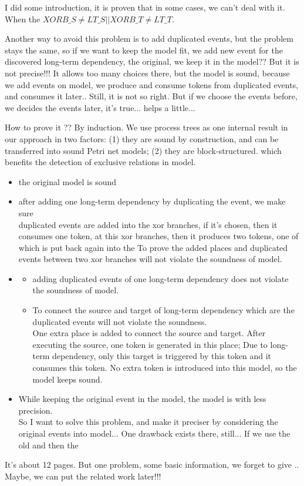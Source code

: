 I did some introduction, it is proven that in some cases, we can't deal with it. When the $XORB\_S \neq LT\_S || XORB\_T \neq LT\_T$.

Another way to avoid this problem is to add duplicated events, but the problem stays the same, so if we want to keep the model fit, we add new event for the discovered long-term dependency, the original, we keep it in the model?? But it is not precise!!! It allows too many choices there, but the model is sound, because we add events on model, we produce and consume tokens from duplicated events, and consumes it later.. Still, it is not so right. But if we choose the events before, we decides the events later, it's true... helps a little... 

How to prove it ?? By induction. 
We use  process  trees as one internal result in  our  approach in two factors: (1) they are sound by construction, and can be transferred into sound Petri net models; (2) they are block-structured. which benefits the detection of exclusive relations in model.

\begin{itemize}
	\item the original model is sound
	\item after adding one long-term dependency by duplicating the event, we make sure
	 \\ duplicated events are added into the xor branches, if it's chosen, then it consumes one token, at this xor branches, then it produces two tokens, one of which is put back again into the 
	 To prove the added places and duplicated events between two xor branches will not violate the soundness of model. 
	 \item 
	 \begin{itemize}
	 	\item adding duplicated events of one long-term dependency does not violate the soundness of model. 
	 	
	 	\item To connect the source and target  of long-term dependency which are the duplicated events will not violate the soundness.
	 	\\ One extra place is added to connect the source and target. After executing the source, one token is generated in this place; Due to long-term dependency, only this target is triggered by this token and it consumes this token. No extra token is introduced into this model, so the model keeps sound. 
	 	
	 \end{itemize}
	 
	 \item While keeping the original event in the model,  the model is with less precision.  
	 \\ 
	 So I want to solve this problem, and make it preciser by considering the original events into model... 
	 One drawback exists there, still... If we use the old and then the 
\end{itemize}

It's about 12 pages. But one problem, some basic information, we forget to give .. Maybe, we can put the related work later!!!

